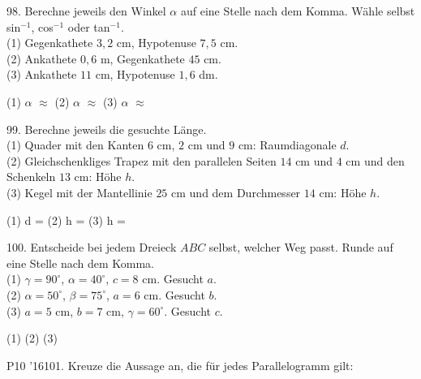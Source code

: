 \documentclass[11pt]{article}
\begin{document}
\pfgruppe{}
\begin{pfaufg}{}{98.}{}
Berechne jeweils den Winkel $\alpha$ auf eine Stelle nach dem Komma. Wähle selbst sin$^{-1}$, cos$^{-1}$ oder tan$^{-1}$.\\ (1) Gegenkathete $3{,}2$ cm, Hypotenuse $7{,}5$ cm.\\ (2) Ankathete $0{,}6$ m, Gegenkathete $45$ cm.\\ (3) Ankathete $11$ cm, Hypotenuse $1{,}6$ dm.
\par\noindent (1) $\alpha$ $\approx$ \leerfeld[°]  (2) $\alpha$ $\approx$ \leerfeld[°]  (3) $\alpha$ $\approx$ \leerfeld[°] \par
{}
\end{pfaufg}
\pfgruppe{}
\begin{pfaufg}{}{99.}{}
Berechne jeweils die gesuchte Länge.\\ (1) Quader mit den Kanten $6$ cm, $2$ cm und $9$ cm: Raumdiagonale $d$.\\ (2) Gleichschenkliges Trapez mit den parallelen Seiten $14$ cm und $4$ cm und den Schenkeln $13$ cm: Höhe $h$.\\ (3) Kegel mit der Mantellinie $25$ cm und dem Durchmesser $14$ cm: Höhe $h$.
\par\noindent (1) d = \leerfeld[cm]  (2) h = \leerfeld[cm]  (3) h = \leerfeld[cm] \par
{}
\end{pfaufg}
\pfgruppe{}
\begin{pfaufg}{}{100.}{}
Entscheide bei jedem Dreieck $ABC$ selbst, welcher Weg passt. Runde auf eine Stelle nach dem Komma.\\ (1) $\gamma = 90^\circ$, $\alpha = 40^\circ$, $c = 8$ cm. Gesucht $a$.\\ (2) $\alpha = 50^\circ$, $\beta = 75^\circ$, $a = 6$ cm. Gesucht $b$.\\ (3) $a = 5$ cm, $b = 7$ cm, $\gamma = 60^\circ$. Gesucht $c$.
\par\noindent (1) \leerfeld[cm]  (2) \leerfeld[cm]  (3) \leerfeld[cm] \par
{}
\end{pfaufg}
\pfgruppe{}
\begin{pfaufg}{P10 ’16}{101.}{}
Kreuze die Aussage an, die für jedes Parallelogramm gilt:
\end{pfaufg}
\end{document}
